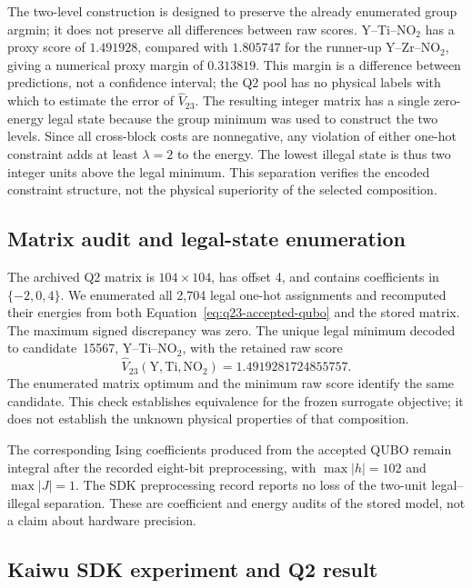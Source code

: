 The two-level construction is designed to preserve the already
enumerated group argmin; it does not preserve all differences between raw
scores.  Y--Ti--$\mathrm{NO}_2$ has a proxy score of $1.491928$, compared
with $1.805747$ for the runner-up Y--Zr--$\mathrm{NO}_2$, giving a
numerical proxy margin of $0.313819$.  This margin is a difference between
predictions, not a confidence interval; the Q2 pool has no physical labels
with which to estimate the error of $\widehat V_{23}$.  The resulting
integer matrix has a single zero-energy legal state because the group
minimum was used to construct the two levels.  Since all cross-block costs
are nonnegative, any violation of either one-hot constraint adds at least
$\lambda=2$ to the energy.  The lowest illegal state is thus two integer
units above the legal minimum.  This separation verifies the encoded
constraint structure, not the physical superiority of the selected
composition.

\subsection{Matrix audit and legal-state enumeration}

The archived Q2 matrix is $104\times104$, has offset 4, and contains
coefficients in $\{-2,0,4\}$.  We enumerated all 2,704 legal one-hot
assignments and recomputed their energies from both
Equation~\eqref{eq:q23-accepted-qubo} and the stored matrix.  The maximum
signed discrepancy was zero.  The unique legal minimum decoded to
candidate~15567, Y--Ti--$\mathrm{NO}_2$, with the retained raw score
\begin{equation}
  \widehat V_{23}(\mathrm{Y},\mathrm{Ti},\mathrm{NO}_2)
  =1.4919281724855757.
  \label{eq:q2-best-score}
\end{equation}
The enumerated matrix optimum and the minimum raw score identify the same
candidate.  This check establishes equivalence for the frozen surrogate
objective; it does not establish the unknown physical properties of that
composition.

The corresponding Ising coefficients produced from the accepted QUBO
remain integral after the recorded eight-bit preprocessing, with
$\max|h|=102$ and $\max|J|=1$.  The SDK preprocessing record reports no
loss of the two-unit legal--illegal separation.  These are coefficient and
energy audits of the stored model, not a claim about hardware precision.

\subsection{Kaiwu SDK experiment and Q2 result}


